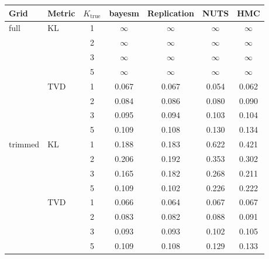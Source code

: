 \begin{tabular}{llccccc}
\toprule
Grid & Metric & $K_{\text{true}}$ & bayesm & Replication & NUTS & HMC \\
\midrule
full & KL & 1 & $\infty$ & $\infty$ & $\infty$ & $\infty$ \\
 &  & 2 & $\infty$ & $\infty$ & $\infty$ & $\infty$ \\
 &  & 3 & $\infty$ & $\infty$ & $\infty$ & $\infty$ \\
 &  & 5 & $\infty$ & $\infty$ & $\infty$ & $\infty$ \\
 & TVD & 1 & 0.067 & 0.067 & 0.054 & 0.062 \\
 &  & 2 & 0.084 & 0.086 & 0.080 & 0.090 \\
 &  & 3 & 0.095 & 0.094 & 0.103 & 0.104 \\
 &  & 5 & 0.109 & 0.108 & 0.130 & 0.134 \\
trimmed & KL & 1 & 0.188 & 0.183 & 0.622 & 0.421 \\
 &  & 2 & 0.206 & 0.192 & 0.353 & 0.302 \\
 &  & 3 & 0.165 & 0.182 & 0.268 & 0.211 \\
 &  & 5 & 0.109 & 0.102 & 0.226 & 0.222 \\
 & TVD & 1 & 0.066 & 0.064 & 0.067 & 0.067 \\
 &  & 2 & 0.083 & 0.082 & 0.088 & 0.091 \\
 &  & 3 & 0.093 & 0.093 & 0.102 & 0.105 \\
 &  & 5 & 0.109 & 0.108 & 0.129 & 0.133 \\
\bottomrule
\end{tabular}
